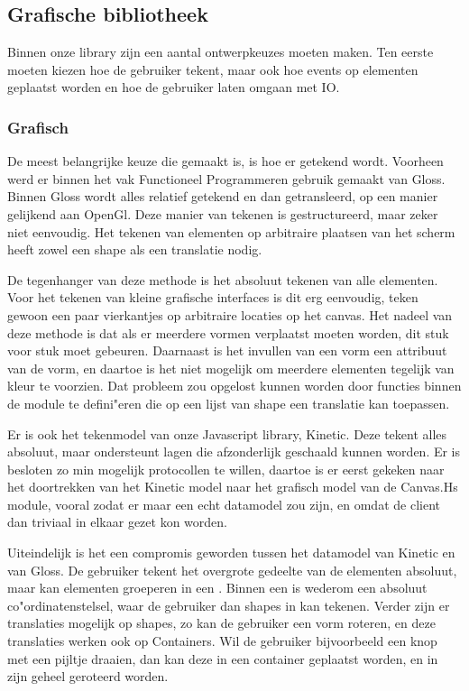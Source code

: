 \subsection{Grafische bibliotheek} \label{subsec:grafische_bibliotheek}

Binnen onze library zijn een aantal ontwerpkeuzes moeten maken. Ten eerste moeten kiezen hoe de gebruiker tekent, maar ook hoe events op elementen geplaatst worden en hoe de gebruiker laten omgaan met IO.

\subsubsection{Grafisch}
De meest belangrijke keuze die gemaakt is, is hoe er getekend wordt. Voorheen werd er binnen het vak Functioneel Programmeren gebruik gemaakt van Gloss. Binnen Gloss wordt alles relatief getekend en dan getransleerd, op een manier gelijkend aan OpenGl. Deze manier van tekenen is gestructureerd, maar zeker niet eenvoudig. Het tekenen van elementen op arbitraire plaatsen van het scherm heeft zowel een shape als een translatie nodig.

De tegenhanger van deze methode is het absoluut tekenen van alle elementen. Voor het tekenen van kleine grafische interfaces is dit erg eenvoudig, teken gewoon een paar vierkantjes op arbitraire locaties op het canvas. Het nadeel van deze methode is dat als er meerdere vormen verplaatst moeten worden, dit stuk voor stuk moet gebeuren. Daarnaast is het invullen van een vorm een attribuut van de vorm, en daartoe is het niet mogelijk om meerdere elementen tegelijk van kleur te voorzien. Dat probleem zou opgelost kunnen worden door functies binnen de module te defini"eren die op een lijst van shape een translatie kan toepassen.

Er is ook het tekenmodel van onze Javascript library, Kinetic. Deze tekent alles absoluut, maar ondersteunt lagen die afzonderlijk geschaald kunnen worden. Er is besloten zo min mogelijk protocollen te willen, daartoe is er eerst gekeken naar het doortrekken van het Kinetic model naar het grafisch model van de Canvas.Hs module, vooral zodat er maar een echt datamodel zou zijn, en omdat de client dan triviaal in elkaar gezet kon worden.

Uiteindelijk is het een compromis geworden tussen het datamodel van Kinetic en van Gloss. De gebruiker tekent het overgrote gedeelte van de elementen absoluut, maar kan elementen groeperen in een . Binnen een  is wederom een absoluut co"ordinatenstelsel, waar de gebruiker dan shapes in kan tekenen. Verder zijn er translaties mogelijk op shapes, zo kan de gebruiker een vorm roteren, en deze translaties werken ook op Containers. Wil de gebruiker bijvoorbeeld een knop met een pijltje draaien, dan kan deze in een container geplaatst worden, en in zijn geheel geroteerd worden.

